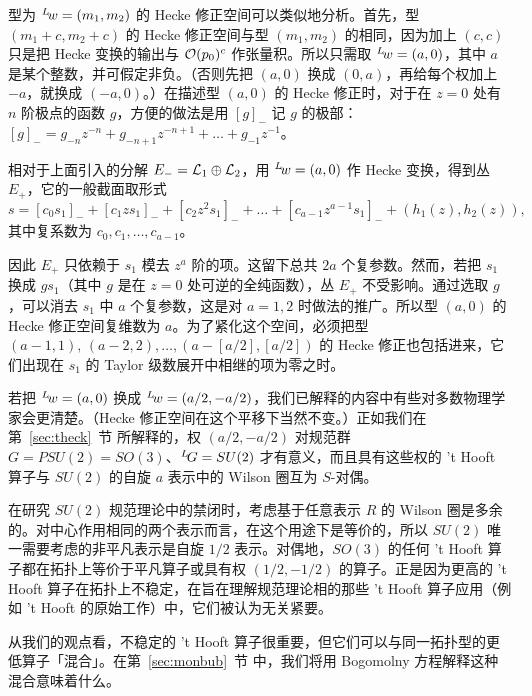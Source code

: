 \par{}

型为 $^L\negthinspace w=(m_1,m_2)$ 的 Hecke 修正空间可以类似地分析。首先，型 $(m_1+c,m_2+c)$ 的 Hecke 修正空间与型 $(m_1,m_2)$ 的相同，因为加上 $(c,c)$ 只是把 Hecke 变换的输出与 ${\cal O}(p_0)^c$ 作张量积。所以只需取 $^L\negthinspace w=(a,0)$，其中 $a$ 是某个整数，并可假定非负。（否则先把 $(a,0)$ 换成 $(0,a)$，再给每个权加上 $-a$，就换成 $(-a,0)$。）在描述型 $(a,0)$ 的 Hecke 修正时，对于在 $z=0$ 处有 $n$ 阶极点的函数 $g$，方便的做法是用 $[g]_-$ 记 $g$ 的极部：$[g]_-=g_{-n}z^{-n}+g_{-n+1}z^{-n+1}+\dots + g_{-1}z^{-1}$。

相对于上面引入的分解 $E_-={\cal L}_1\oplus {\cal L}_2$，用 $^L\negthinspace w=(a,0)$ 作 Hecke 变换，得到丛 $E_+$，它的一般截面取形式
\setcounter{equation}{22}
\begin{equation}\label{eq:indon}
s=[c_0s_1]_-+[c_1zs_1]_-+[c_2z^2s_1]_-+\dots
+[c_{a-1}z^{a-1}s_1]_-+(h_1(z),h_2(z)),
\end{equation}
其中复系数为 $c_0,c_1,\dots,c_{a-1}$。

因此 $E_+$ 只依赖于 $s_1$ 模去 $z^a$ 阶的项。这留下总共 $2a$ 个复参数。然而，若把 $s_1$ 换成 $gs_1$（其中 $g$ 是在 $z=0$ 处可逆的全纯函数），丛 $E_+$ 不受影响。通过选取 $g$，可以消去 $s_1$ 中 $a$ 个复参数，这是对 $a=1,2$ 时做法的推广。所以型 $(a,0)$ 的 Hecke 修正空间复维数为 $a$。为了紧化这个空间，必须把型 $(a-1,1), \,(a-2,2),\dots, (a-[a/2],[a/2])$ 的 Hecke 修正也包括进来，它们出现在 $s_1$ 的 Taylor 级数展开中相继的项为零之时。

若把 $^L\negthinspace w=(a,0)$ 换成 $^L\negthinspace w=(a/2,-a/2)$，我们已解释的内容中有些对多数物理学家会更清楚。（Hecke 修正空间在这个平移下当然不变。）正如我们在第~\ref{sec:theck}~节 所解释的，权 $(a/2,-a/2)$ 对规范群 $G=PSU(2)=SO(3)$、$^L\negthinspace G=SU(2)$ 才有意义，而且具有这些权的 't Hooft 算子与 $SU(2)$ 的自旋 $a$ 表示中的 Wilson 圈互为 $S$-对偶。

在研究 $SU(2)$ 规范理论中的禁闭时，考虑基于任意表示 $R$ 的 Wilson 圈是多余的。对中心作用相同的两个表示而言，在这个用途下是等价的，所以 $SU(2)$ 唯一需要考虑的非平凡表示是自旋 $1/2$ 表示。对偶地，$SO(3)$ 的任何 't Hooft 算子都在拓扑上等价于平凡算子或具有权 $(1/2,-1/2)$ 的算子。正是因为更高的 't Hooft 算子在拓扑上不稳定，在旨在理解规范理论相的那些 't Hooft 算子应用（例如 't Hooft 的原始工作）中，它们被认为无关紧要。

从我们的观点看，不稳定的 't Hooft 算子很重要，但它们可以与同一拓扑型的更低算子「混合」。在第~\ref{sec:monbub}~节 中，我们将用 Bogomolny 方程解释这种混合意味着什么。

